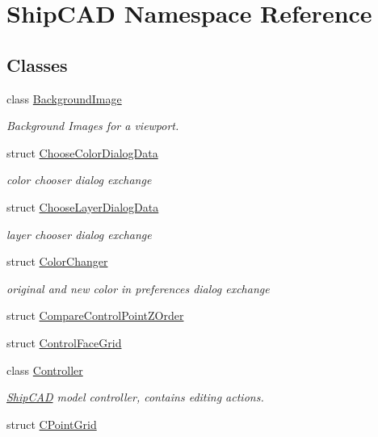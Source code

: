 \hypertarget{namespaceShipCAD}{}\section{Ship\+C\+AD Namespace Reference}
\label{namespaceShipCAD}
\subsection*{Classes}
\begin{DoxyCompactItemize}
\item 
class \hyperlink{classShipCAD_1_1BackgroundImage}{Background\+Image}
\begin{DoxyCompactList}\small\item\em Background Images for a viewport. \end{DoxyCompactList}\item 
struct \hyperlink{structShipCAD_1_1ChooseColorDialogData}{Choose\+Color\+Dialog\+Data}
\begin{DoxyCompactList}\small\item\em color chooser dialog exchange \end{DoxyCompactList}\item 
struct \hyperlink{structShipCAD_1_1ChooseLayerDialogData}{Choose\+Layer\+Dialog\+Data}
\begin{DoxyCompactList}\small\item\em layer chooser dialog exchange \end{DoxyCompactList}\item 
struct \hyperlink{structShipCAD_1_1ColorChanger}{Color\+Changer}
\begin{DoxyCompactList}\small\item\em original and new color in preferences dialog exchange \end{DoxyCompactList}\item 
struct \hyperlink{structShipCAD_1_1CompareControlPointZOrder}{Compare\+Control\+Point\+Z\+Order}
\item 
struct \hyperlink{structShipCAD_1_1ControlFaceGrid}{Control\+Face\+Grid}
\item 
class \hyperlink{classShipCAD_1_1Controller}{Controller}
\begin{DoxyCompactList}\small\item\em \hyperlink{namespaceShipCAD}{Ship\+C\+AD} model controller, contains editing actions. \end{DoxyCompactList}\item 
struct \hyperlink{structShipCAD_1_1CPointGrid}{C\+Point\+Grid}

\end{DoxyCompactItemize}
